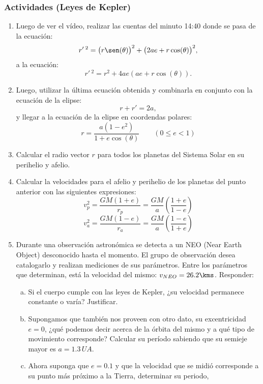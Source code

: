 \subsubsection*{Actividades (Leyes de Kepler)}
\small

\begin{enumerate}
  \item Luego de ver el vídeo, realizar las cuentas del minuto 14:40 donde se
    pasa de la ecuación:
    \[
      r'\,^2 = \big(r\sen(\theta)\big)^2 + \big(2ae + r \cos (\theta)\big)^2,
    \]
    a la ecuación:
    \[
      r'\,^2 = r^2 + 4ae(ae+r\cos(\theta)).
    \]
    \item Luego, utilizar la última ecuación obtenida y combinarla en conjunto
      con la ecuación de la elipse:
      \[
	r + r' = 2a,
      \]
      y llegar a la ecuación de la elipse en coordendas polares:
      \[
	r = \dfrac{a(1-e^2)}{1+e\cos(\theta)} \qquad (0\le e < 1)
      \]
    \item Calcular el radio vector $r$ para todos los planetas del Sistema Solar
      en su perihelio y afelio.
    \item Calcular la velocidades para el afelio y perihelio de los planetas del
      punto anterior con las siguientes expresiones:
      \[
	v_p^2=\dfrac{GM(1+e)}{r_p} = \dfrac{GM}{a}\left(\dfrac{1+e}{1-e}\right)
	\]
      \[
	v_a^2 = \dfrac{GM(1-e)}{r_a} =
	\dfrac{GM}{a}\left(\dfrac{1-e}{1+e}\right)
	\]
    \item Durante una observación astronómica se detecta a un NEO (Near Earth
      Object) desconocido hasta el momento. El grupo de observación desea
      catalogarlo y realizan mediciones de sus parámetros. Entre los parámetros
      que determinan, está la velocidad del mismo: \mbox{$v_{NEO}=26.2\kms$}.
      Responder:
      \begin{enumerate}[a)]
	\item Si el cuerpo cumple con las leyes de Kepler, ¿su velocidad
	  permanece constante o varía? Justificar.
	\item Supongamos que también nos proveen con otro dato, su excentricidad
	  $e=0$, ¿qué podemos decir acerca de la órbita del mismo y a qué tipo
	  de movimiento corresponde? Calcular su período sabiendo que su semieje
	  mayor es $a=1.3\,UA$.
	\item Ahora suponga que $e=0.1$ y que la velocidad que se midió
	  corresponde a su punto más próximo a la Tierra, determinar su periodo,

\end{enumerate}
\end{enumerate}
